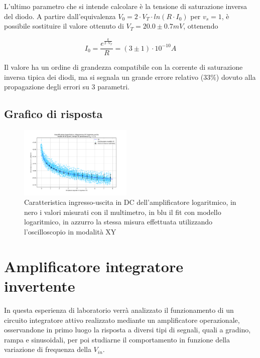 \documentclass[journal]{IEEEtran}
\begin{document}
L'ultimo parametro che si intende calcolare è la tensione di saturazione inversa del diodo.
A partire dall'equivalenza $V_0 = 2 \cdot V_T \cdot ln(R \cdot I_0)$  per $v_s = 1$, è possibile sostituire il valore ottenuto di $V_T = 20.0 \pm 0.7 mV$, ottenendo

\[ I_0 = \frac{e^{\frac{k}{2 \cdot V_T}}}{R} = (3 \pm 1) \cdot 10^{-10} A \]

Il valore ha un ordine di grandezza compatibile con la corrente di saturazione inversa tipica dei diodi, ma si segnala un grande errore relativo ($33 \% $) dovuto alla propagazione degli errori su 3 parametri.


\subsection{Grafico di risposta}

\begin{figure}[H]%
\begin {center}
\includegraphics[trim = {100px 0 0 0}, width=0.48\textwidth]{analysis/output/OPA-log-fitted.pdf}
\caption{Caratteristica ingresso-uscita in DC dell'amplificatore logaritmico, in nero i valori misurati con il multimetro, in blu il fit con modello logaritmico, in azzurro la stessa misura effettuata utilizzando l'oscilloscopio in modalità XY}
\label{fig:log_ampl_fit_xy}
\end {center}
\end{figure}


\section{\textbf{Amplificatore integratore invertente}} %
In questa esperienza di laboratorio verrà analizzato il funzionamento di un circuito integratore attivo realizzato mediante un amplificatore operazionale, osservandone in primo luogo la risposta a diversi tipi di segnali, quali a gradino, rampa e sinusoidali, per poi studiarne il comportamento in funzione della variazione di frequenza della $V_{in}$.
\end{document}
